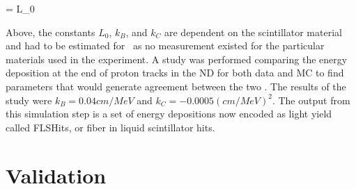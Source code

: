 \beq
{} = L_0  
\label{eq:BirksChou}
\eeq

\n Above, the constants $L_0$, $k_B$, and $k_C$ are dependent on the scintillator material and had to be estimated for \nova~as no measurement existed for the particular materials used in the experiment. A study was performed comparing the energy deposition at the end of proton tracks in the ND for both data and MC to find parameters that would generate agreement between the two \cite{ref:DanBirks}. The results of the study were $k_B = 0.04\unit{cm/MeV}$ and $k_C = -0.0005\unit{(cm/MeV)}^2$. The output from this simulation step is a set of energy depositions now encoded as light yield called FLSHits, or fiber in liquid scintillator hits.

\section{Validation}